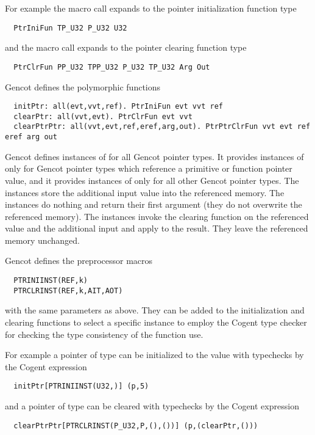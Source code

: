 For example the macro call  expands to the pointer initialization function type
\begin{verbatim}
  PtrIniFun TP_U32 P_U32 U32
\end{verbatim}
and the macro call  expands to the pointer clearing function type
\begin{verbatim}
  PtrClrFun PP_U32 TPP_U32 P_U32 TP_U32 Arg Out
\end{verbatim}

Gencot defines the polymorphic functions
\begin{verbatim}
  initPtr: all(evt,vvt,ref). PtrIniFun evt vvt ref
  clearPtr: all(vvt,evt). PtrClrFun evt vvt
  clearPtrPtr: all(vvt,evt,ref,eref,arg,out). PtrPtrClrFun vvt evt ref eref arg out
\end{verbatim}
Gencot defines instances of  for all Gencot pointer types. It provides instances of  only for Gencot pointer types which
reference a primitive or function pointer value, and it provides instances of  only for all other Gencot pointer types.
The  instances store the additional input value 
into the referenced memory. The  instances do nothing and return their first argument (they do not overwrite the referenced memory).
The  instances invoke the clearing function on the referenced value and the additional input and apply  to the result.
They leave the referenced memory unchanged. 

Gencot defines the preprocessor macros
\begin{verbatim}
  PTRINIINST(REF,k)
  PTRCLRINST(REF,k,AIT,AOT)
\end{verbatim}
with the same parameters as above. They can be added to the initialization and clearing functions to select a specific instance
to employ the Cogent type checker for checking the type consistency of the function use.

For example a pointer  of type  can be initialized to the value  with typechecks by the Cogent expression
\begin{verbatim}
  initPtr[PTRINIINST(U32,)] (p,5)
\end{verbatim}
and a pointer  of type  can be cleared with typechecks by the Cogent expression
\begin{verbatim}
  clearPtrPtr[PTRCLRINST(P_U32,P,(),())] (p,(clearPtr,()))
\end{verbatim}

